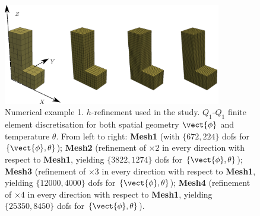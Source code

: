 \begin{figure}[hbtp]
	\centering
	\includegraphics[width=0.85\textwidth]{Figures/Example1/Meshesv2.pdf}
	\caption{Numerical example 1. $h$-refinement used in the study. $Q_1$-$Q_1$ finite element discretisation for both spatial geometry $\vect{\phi}$ and temperature $\theta$. From left to right: \textbf{Mesh1} (with $\{672,224\}$ dofs for $\{\vect{\phi},\theta\}$); \textbf{Mesh2} (refinement of $\times 2$ in every direction with respect to \textbf{Mesh1}, yielding $\{3822,1274\}$ dofs for $\{\vect{\phi},\theta\}$); \textbf{Mesh3} (refinement of $\times 3$ in every direction with respect to \textbf{Mesh1}, yielding $\{12000,4000\}$ dofs for $\{\vect{\phi},\theta\}$); \textbf{Mesh4} (refinement of $\times 4$ in every direction with respect to \textbf{Mesh1}, yielding $\{25350,8450\}$ dofs for $\{\vect{\phi},\theta\}$).}
	\label{fig:LShape meshes}
\end{figure}
%

